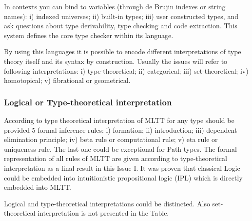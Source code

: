 \documentclass[twoside]{article}
\theoremstyle{definition}
\begin{document}
In contexts you can bind to variables (through de Brujin indexes or string names):
i) indexed universes; ii) built-in types; iii) user constructed types, and ask
questions about type derivability, type checking and code extraction. This system
defines the core type checker within its language.

By using this languages it is possible to encode different interpretations of
type theory itself and its syntax by construction. Usually the issues will refer to
following interpretations: i) type-theoretical; ii) categorical;
iii) set-theoretical; iv) homotopical; v) fibrational or geometrical.

\subsubsection{Logical or Type-theoretical interpretation}

According to type theoretical interpretation of MLTT for any type should be provided 5 formal
inference rules: i) formation; ii) introduction; iii) dependent elimination principle;
iv) beta rule or computational rule; v) eta rule or uniqueness rule. The last one could
be exceptional for Path types. The formal representation of all rules of MLTT
are given according to type-theoretical interpretation as a final result in this Issue I.
It was proven that classical Logic could be embedded into
intuitionistic propositional logic (IPL) which is directly embedded into MLTT.

Logical and type-theoretical interpretations could be distincted. Also
set-theoretical interpretation is not presented in the Table.
\end{document}
